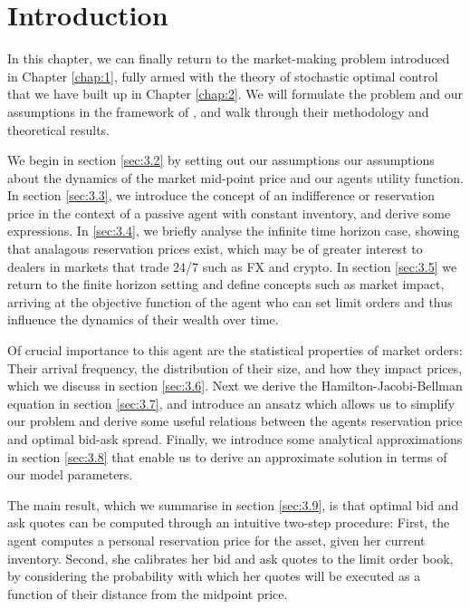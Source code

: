 \section{Introduction}\label{sec:3.1}

In this chapter, we can finally return to the market-making problem introduced in
Chapter \ref{chap:1}, fully armed with the theory of stochastic optimal control 
that we have built up in Chapter \ref{chap:2}. We will formulate the problem and our
assumptions in the framework of \cite{AS2008}, and walk through
their methodology and theoretical results. 

We begin in section \ref{sec:3.2} by setting out our assumptions our assumptions about 
the dynamics of the market mid-point price and our agents utility function. In section 
\ref{sec:3.3}, we introduce the concept of an indifference or reservation price in the 
context of a passive agent with constant inventory, and derive some expressions. In 
\ref{sec:3.4}, we briefly analyse the infinite time horizon case, showing that 
analagous reservation prices exist, which may be of greater interest to dealers in 
markets that trade 24/7 such as FX and crypto. In section \ref{sec:3.5} we return to 
the finite horizon setting and define concepts such as market impact, arriving at the 
objective function of the agent who can set limit orders and thus influence the dynamics 
of their wealth over time. 

Of crucial importance to this
agent are the statistical properties of market orders: Their arrival frequency, the 
distribution of their size, and how they impact prices, which we discuss in section
\ref{sec:3.6}. Next we derive the Hamilton-Jacobi-Bellman equation in section \ref{sec:3.7},
and introduce an ansatz which allows us to simplify our problem and derive some useful
relations between the agents reservation price and optimal bid-ask spread. Finally,
we introduce some analytical approximations in section \ref{sec:3.8} that enable us to
derive an approximate solution in terms of our model parameters. 

The main result, which
we summarise in section \ref{sec:3.9}, is that optimal bid and ask quotes can be computed
through an intuitive two-step procedure: First, the agent computes a personal reservation
price for the asset, given her current inventory. Second, she calibrates her bid and ask
quotes to the limit order book, by considering the probability with which her quotes will
be executed as a function of their distance from the midpoint price.

